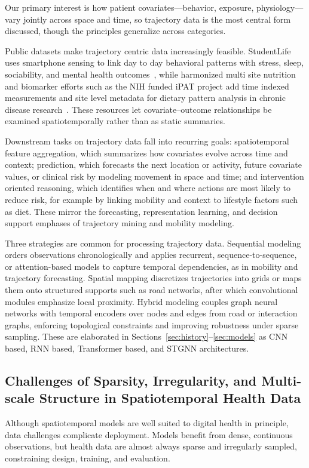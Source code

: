 \documentclass[journal]{IEEEtran}
\begin{document}
Our primary interest is how patient covariates---behavior, exposure, physiology---vary jointly across space and time, so trajectory data is the most central form discussed, though the principles generalize across categories.

Public datasets make trajectory centric data increasingly feasible. StudentLife uses smartphone sensing to link day to day behavioral patterns with stress, sleep, sociability, and mental health outcomes~\cite{wang2014studentlife}, while harmonized multi site nutrition and biomarker efforts such as the NIH funded iPAT project add time indexed measurements and site level metadata for dietary pattern analysis in chronic disease research~\cite{Fang2021iPAT}. These resources let covariate--outcome relationships be examined spatiotemporally rather than as static summaries.

Downstream tasks on trajectory data fall into recurring goals: spatiotemporal feature aggregation, which summarizes how covariates evolve across time and context; prediction, which forecasts the next location or activity, future covariate values, or clinical risk by modeling movement in space and time; and intervention oriented reasoning, which identifies when and where actions are most likely to reduce risk, for example by linking mobility and context to lifestyle factors such as diet. These mirror the forecasting, representation learning, and decision support emphases of trajectory mining and mobility modeling.

Three strategies are common for processing trajectory data. Sequential modeling orders observations chronologically and applies recurrent, sequence-to-sequence, or attention-based models to capture temporal dependencies, as in mobility and trajectory forecasting. Spatial mapping discretizes trajectories into grids or maps them onto structured supports such as road networks, after which convolutional modules emphasize local proximity. Hybrid modeling couples graph neural networks with temporal encoders over nodes and edges from road or interaction graphs, enforcing topological constraints and improving robustness under sparse sampling. These are elaborated in Sections~\ref{sec:history}--\ref{sec:models} as CNN based, RNN based, Transformer based, and STGNN architectures.

\subsection{Challenges of Sparsity, Irregularity, and Multi-scale Structure in Spatiotemporal Health Data}
Although spatiotemporal models are well suited to digital health in principle, data challenges complicate deployment. Models benefit from dense, continuous observations, but health data are almost always sparse and irregularly sampled, constraining design, training, and evaluation.
\end{document}
